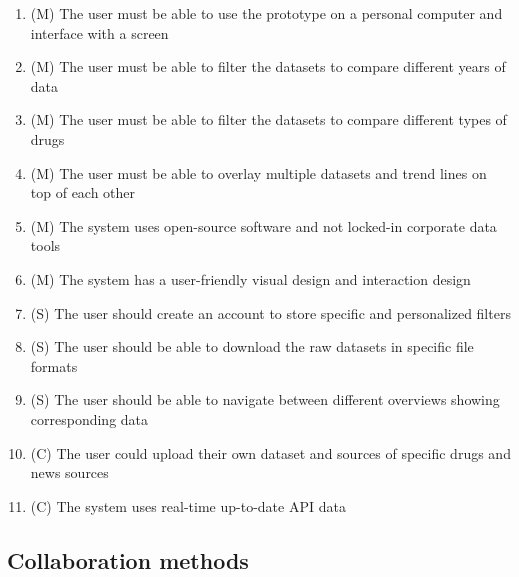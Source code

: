  \begin{enumerate}
   \item (M) The user must be able to use the prototype on a personal computer and interface with a screen
   \item (M) The user must be able to filter the datasets to compare different years of data
   \item (M) The user must be able to filter the datasets to compare different types of drugs
   \item (M) The user must be able to overlay multiple datasets and trend lines on top of each other
   \item (M) The system uses open-source software and not locked-in corporate data tools
   \item (M) The system has a user-friendly visual design and interaction design
   \item (S) The user should create an account to store specific and personalized filters
   \item (S) The user should be able to download the raw datasets in specific file formats
   \item (S) The user should be able to navigate between different overviews showing corresponding data
   \item (C) The user could upload their own dataset and sources of specific drugs and news sources
   \item (C) The system uses real-time up-to-date API data
 \end{enumerate}

 \subsection{Collaboration methods}
